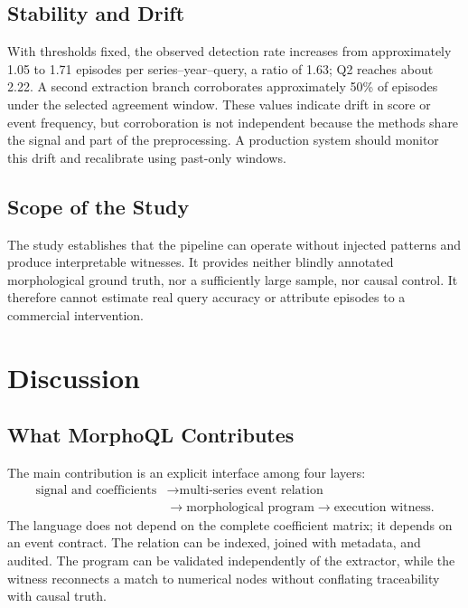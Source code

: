\subsection{Stability and Drift}

With thresholds fixed, the observed detection rate increases from approximately 1.05 to 1.71 episodes per series--year--query, a ratio of 1.63; Q2 reaches about 2.22. A second extraction branch corroborates approximately 50\% of episodes under the selected agreement window. These values indicate drift in score or event frequency, but corroboration is not independent because the methods share the signal and part of the preprocessing. A production system should monitor this drift and recalibrate using past-only windows.

\subsection{Scope of the Study}

The study establishes that the pipeline can operate without injected patterns and produce interpretable witnesses. It provides neither blindly annotated morphological ground truth, nor a sufficiently large sample, nor causal control. It therefore cannot estimate real query accuracy or attribute episodes to a commercial intervention.

\section{Discussion}

\subsection{What MorphoQL Contributes}

The main contribution is an explicit interface among four layers:
\begin{equation}
\begin{aligned}
 \text{signal and coefficients}
 &\longrightarrow \text{multi-series event relation}\\
 &\longrightarrow \text{morphological program}
 \longrightarrow \text{execution witness}.
\end{aligned}
\end{equation}
The language does not depend on the complete coefficient matrix; it depends on an event contract. The relation can be indexed, joined with metadata, and audited. The program can be validated independently of the extractor, while the witness reconnects a match to numerical nodes without conflating traceability with causal truth.

